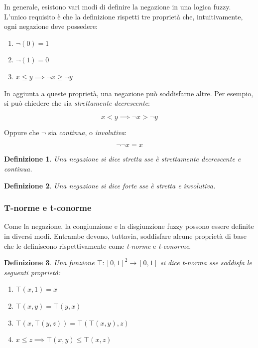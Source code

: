 \documentclass[10pt,a4paper]{article}
\newtheorem{definition}{Definizione}
\begin{document}
In generale, esistono vari modi di definire la negazione in una logica fuzzy. L'unico requisito è che la definizione rispetti tre proprietà che, intuitivamente, ogni negazione deve possedere:

\begin{enumerate}
\item{$\neg(0) = 1$} 
\item{$\neg(1) = 0$}
\item{$x \leq y \implies \neg x \geq \neg y$}
\end{enumerate}

In aggiunta a queste proprietà, una negazione può soddisfarne altre. Per esempio, si può chiedere che sia \emph{strettamente decrescente}:

$$
x < y \implies \neg x > \neg y
$$

Oppure che $\neg$ sia \emph{continua}, o \emph{involutiva}:

$$
\neg \neg x = x
$$

\begin{definition}
Una negazione si dice \emph{stretta} sse è strettamente decrescente e continua.
\end{definition}

\begin{definition}
Una negazione si dice \emph{forte} sse è stretta e involutiva.
\end{definition}

\subsubsection{T-norme e t-conorme}

Come la negazione, la congiunzione e la disgiunzione fuzzy possono essere definite in diversi modi. Entrambe devono, tuttavia, soddisfare alcune proprietà di base che le definiscono rispettivamente come \emph{t-norme} e \emph{t-conorme}.

\begin{definition}
Una funzione $\top : [0,1]^2 \to [0,1]$ si dice \emph{t-norma} sse soddisfa le seguenti proprietà:
\begin{enumerate}
\item{$\top(x,1) = x$}
\item{$\top(x,y) = \top(y,x)$}
\item{$\top(x,\top(y,z)) = \top(\top(x,y),z)$}
\item{$x \leq z \implies \top(x,y) \leq \top(x,z)$}
\end{enumerate}
\end{definition}
\end{document}

